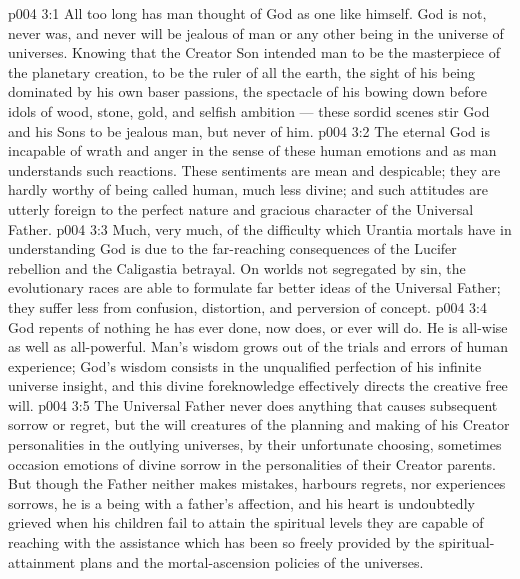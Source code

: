 \vs p004 3:1 All too long has man thought of God as one like himself. God is not, never was, and never will be jealous of man or any other being in the universe of universes. Knowing that the Creator Son intended man to be the masterpiece of the planetary creation, to be the ruler of all the earth, the sight of his being dominated by his own baser passions, the spectacle of his bowing down before idols of wood, stone, gold, and selfish ambition --- these sordid scenes stir God and his Sons to be jealous  man, but never of him.
\vs p004 3:2 The eternal God is incapable of wrath and anger in the sense of these human emotions and as man understands such reactions. These sentiments are mean and despicable; they are hardly worthy of being called human, much less divine; and such attitudes are utterly foreign to the perfect nature and gracious character of the Universal Father.
\vs p004 3:3 \pc Much, very much, of the difficulty which Urantia mortals have in understanding God is due to the far\hyp{}reaching consequences of the Lucifer rebellion and the Caligastia betrayal. On worlds not segregated by sin, the evolutionary races are able to formulate far better ideas of the Universal Father; they suffer less from confusion, distortion, and perversion of concept.
\vs p004 3:4 \pc God repents of nothing he has ever done, now does, or ever will do. He is all\hyp{}wise as well as all\hyp{}powerful. Man’s wisdom grows out of the trials and errors of human experience; God’s wisdom consists in the unqualified perfection of his infinite universe insight, and this divine foreknowledge effectively directs the creative free will.
\vs p004 3:5 The Universal Father never does anything that causes subsequent sorrow or regret, but the will creatures of the planning and making of his Creator personalities in the outlying universes, by their unfortunate choosing, sometimes occasion emotions of divine sorrow in the personalities of their Creator parents. But though the Father neither makes mistakes, harbours regrets, nor experiences sorrows, he is a being with a father’s affection, and his heart is undoubtedly grieved when his children fail to attain the spiritual levels they are capable of reaching with the assistance which has been so freely provided by the spiritual\hyp{}attainment plans and the mortal\hyp{}ascension policies of the universes.
